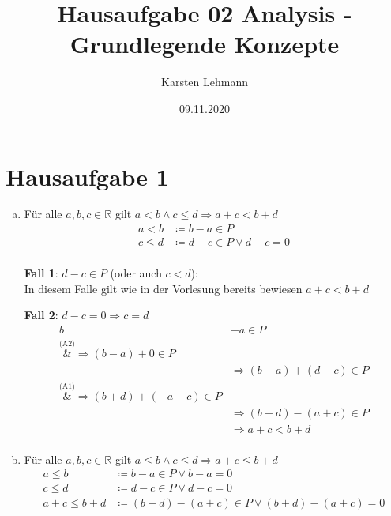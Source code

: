 \documentclass{article}
\author{Karsten Lehmann}
\date{09.11.2020}
\title{Hausaufgabe 02 Analysis - Grundlegende Konzepte}
\begin{document}
\maketitle
\newpage

\section*{Hausaufgabe 1}

\begin{enumerate}[a)]
\item Für alle $a, b, c \in \mathbb{R}$ gilt $a < b \land c \leq d \Rightarrow a + c < b + d$
  \begin{align*}
    a < b &\coloneqq b - a \in P \\
    c \leq d &\coloneqq d - c \in P \lor d - c = 0 \\
  \end{align*} 
  \begin{minipage}[t]{.45\textwidth}
    \textbf{Fall 1}: $d - c \in P$ (oder auch $c < d$): \\
    
    In diesem Falle gilt wie in der Vorlesung bereits bewiesen
    $a + c < b + d$
  \end{minipage}
  \hfill
  \vrule
  \hfill
  \begin{minipage}[t]{.45\textwidth}
    \textbf{Fall 2}: $d - c = 0 \Rightarrow c = d$
    \begin{align*}
      b &- a \in P \\
      \overset{\text{(A2)}}&{\Rightarrow} (b - a) + 0 \in P \\
      &\Rightarrow (b - a) + (d - c) \in P \\
      \overset{\text{(A1)}}&{\Rightarrow} (b + d) + (-a -c) \in P\\
      &\Rightarrow (b + d) - (a + c) \in P \\
      &\Rightarrow a + c < b + d \\
    \end{align*}
  \end{minipage}

\item Für alle $a, b, c \in \mathbb{R}$ gilt $a \leq b \land c \leq d \Rightarrow a + c \leq b + d$
  \begin{align*}
    a \leq b &\coloneqq b - a \in P \lor b - a = 0 \\
    c \leq d &\coloneqq d - c \in P \lor d - c = 0 \\
    a + c \leq b + d &\coloneqq (b + d) - (a + c) \in P \lor (b + d) - (a + c) = 0 \\ 
  \end{align*}
  

\end{enumerate}
\end{document}
